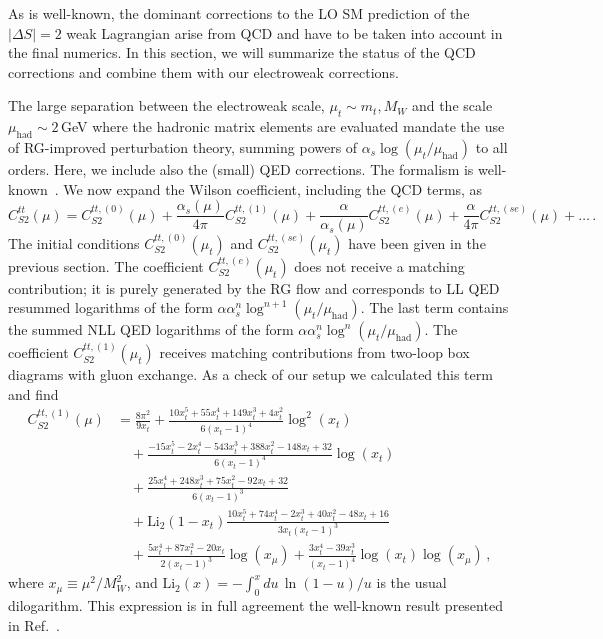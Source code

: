 \documentclass[letter,11pt,DIV=12,abstract=true,numbers=noenddot,titlepage=false,twocolumn=false,draft=false]{scrartcl}
\begin{document}
As is well-known, the dominant corrections to the LO SM prediction of
the $|\Delta S| = 2$ weak Lagrangian arise from QCD and have to be
taken into account in the final numerics. In this section, we will
summarize the status of the QCD corrections and combine them with our
electroweak corrections.

The large separation between the electroweak scale, $\mu_t \sim m_t,
M_W$ and the scale $\mu_\text{had} \sim 2\,$GeV where the hadronic
matrix elements are evaluated mandate the use of RG-improved
perturbation theory, summing powers of $\alpha_s
\log(\mu_t/\mu_\text{had})$ to all orders. Here, we include also the
(small) QED corrections. The formalism is
well-known~\cite{Buchalla:1995vs, Buras:1993dy}. We now expand the
Wilson coefficient, including the QCD terms, as
\begin{equation}\label{eq:expand:C}
  C_{S2}^{tt}(\mu)
= C_{S2}^{tt,(0)}(\mu)
  + \frac{\alpha_s(\mu)}{4\pi} C_{S2}^{tt,(1)}(\mu)
  + \frac{\alpha}{\alpha_s(\mu)} C_{S2}^{tt,(e)}(\mu)
  + \frac{\alpha}{4\pi} C_{S2}^{tt,(se)}(\mu) + \ldots \,.
\end{equation}
The initial conditions $C_{S2}^{tt,(0)}(\mu_t)$ and $
C_{S2}^{tt,(se)}(\mu_t)$ have been given in the previous section. The
coefficient $C_{S2}^{tt,(e)}(\mu_t)$ does not receive a matching
contribution; it is purely generated by the RG flow and corresponds to
LL QED resummed logarithms of the form $\alpha \alpha_s^n
\log^{n+1}(\mu_t/\mu_\text{had})$. The last term contains the summed
NLL QED logarithms of the form $\alpha \alpha_s^n
\log^{n}(\mu_t/\mu_\text{had})$. The coefficient
$C_{S2}^{tt,(1)}(\mu_t)$ receives matching contributions from two-loop
box diagrams with gluon exchange. As a check of our setup we
calculated this term and find
\begin{equation}
\begin{split}
C_{S2}^{tt,(1)}(\mu)  
& =       \frac{8\pi^2}{9 x_t}
        + \frac{10 x_t^5 + 55 x_t^4 + 149 x_t^3 + 4 x_t^2}{6 (x_t-1)^4} \log^2(x_t) \\
& \quad + \frac{ - 15 x_t^5 - 2 x_t^4 - 543 x_t^3 + 388 x_t^2 - 148 x_t + 32}{6 (x_t-1)^4} \log(x_t) \\
& \quad + \frac{25 x_t^4 + 248 x_t^3 + 75 x_t^2 - 92 x_t + 32}{6 (x_t-1)^3} \\
& \quad + \text{Li}_2(1 - x_t) \frac{10 x_t^5 + 74 x_t^4 - 2 x_t^3 + 40 x_t^2 - 48 x_t + 16}{3x_t(x_t-1)^3} \\
& \quad + \frac{5 x_t^4 + 87 x_t^2 - 20 x_t}{2 (x_t-1)^3} \log(x_\mu)
        + \frac{3 x_t^4 - 39 x_t^3}{(x_t-1)^4}
          \log(x_t) \log(x_\mu) \,,
\end{split}
\end{equation}
where $x_\mu \equiv \mu^2/M_W^2$, and $\text{Li}_2 (x) = -\int_0^x du
\, \ln (1-u)/u$ is the usual dilogarithm. This expression is in full
agreement the well-known result presented in Ref.~\cite{Buras:1990fn}.
\end{document}
